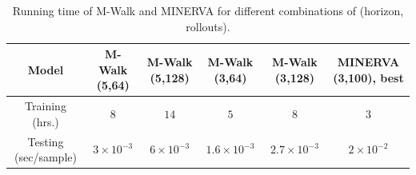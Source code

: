 \documentclass{article}
\begin{document}
\vspace{-0.5em}
\begin{table}[h]
\begin{center}
\caption{{\small Running time of M-Walk and MINERVA for different combinations of (horizon, rollouts).}}
\label{tab:running_time}
\scriptsize
\begin{tabular}{|c|c|c|c|c|c|}
\hline
Model & M-Walk (5,64) &  M-Walk (5,128) &  M-Walk (3,64) &  M-Walk (3,128) & MINERVA (3,100), best \\
\hline
Training (hrs.)  & $8$  & $14$ & $5$ & $8$ & $3$ \\
\hline
Testing (sec/sample) & $3\times 10^{-3}$ & $6\times 10^{-3}$ & $1.6\times 10^{-3}$ & $2.7\times 10^{-3}$ & $2\times10^{-2}$  \\
\hline
\end{tabular}
\end{center}
\label{default}
\end{table}%
\end{document}
